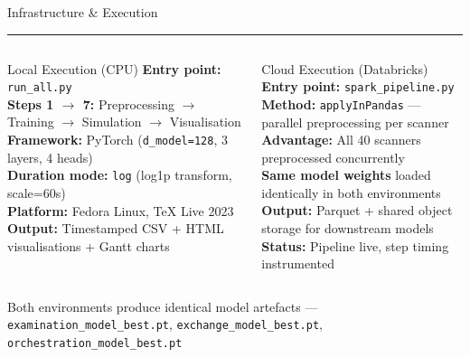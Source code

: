 \documentclass[aspectratio=169,12pt]{beamer}
\newcommand{\tealsep}{\vspace{1pt}\textcolor{SiemensTeal}{\rule{\linewidth}{1pt}}\vspace{4pt}}
\begin{document}
\begin{frame}[shrink=20]{Infrastructure \& Execution}
\tealsep
\begin{columns}[T]
\begin{block}{Local Execution (CPU)}
  \vspace{4pt}
  \textbf{Entry point:} \texttt{run\_all.py}\\[4pt]
  \textbf{Steps 1 $\to$ 7:} Preprocessing $\to$ Training $\to$ Simulation $\to$ Visualisation\\[4pt]
  \textbf{Framework:} PyTorch (\texttt{d\_model=128}, 3 layers, 4 heads)\\[4pt]
  \textbf{Duration mode:} \texttt{log} (log1p transform, scale=60s)\\[4pt]
  \textbf{Platform:} Fedora Linux, TeX Live 2023\\[4pt]
  \textbf{Output:} Timestamped CSV + HTML visualisations + Gantt charts
\end{block}

\begin{exampleblock}{Cloud Execution (Databricks)}
  \vspace{4pt}
  \textbf{Entry point:} \texttt{spark\_pipeline.py}\\[4pt]
  \textbf{Method:} \texttt{applyInPandas} — parallel preprocessing per scanner\\[4pt]
  \textbf{Advantage:} All 40 scanners preprocessed concurrently\\[4pt]
  \textbf{Same model weights} loaded identically in both environments\\[4pt]
  \textbf{Output:} Parquet + shared object storage for downstream models\\[4pt]
  \textbf{Status:} Pipeline live, step timing instrumented
\end{exampleblock}
\end{columns}
\vspace{6pt}
\textcolor{SiemensMuted}{\footnotesize Both environments produce identical model artefacts — \texttt{examination\_model\_best.pt}, \texttt{exchange\_model\_best.pt}, \texttt{orchestration\_model\_best.pt}}
\end{frame}
\end{document}
